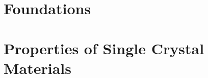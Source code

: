 \documentclass[11pt,fleqn,A4paper]{book} %
\begin{document}



\part{Foundations}

\part{Properties of Single Crystal Materials}


\end{document}
